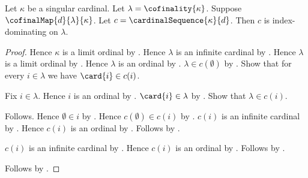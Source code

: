 \begin{proposition}\label{cardinal_sequence_is_index_dominating}
    Let $\kappa$ be a singular cardinal.
    Let $\lambda=\cofinality{\kappa}$.
    Suppose $\cofinalMap{d}{\lambda}{\kappa}$.
    Let $c=\cardinalSequence{\kappa}{d}$.
    Then $c$ is index-dominating on $\lambda$.
\end{proposition}
\begin{proof}
    Hence $\kappa$ is a limit ordinal
        by .
    Hence $\lambda$ is an infinite cardinal
        by .
    Hence $\lambda$ is a limit ordinal
        by .
    Hence $\lambda$ is an ordinal by .
    $\lambda\in c(\emptyset)$
        by .
    Show that for every $i\in\lambda$ we have $\card{i}\in c(i)$.
    \begin{subproof}
        Fix $i\in\lambda$.
        Hence $i$ is an ordinal by .
        $\card{i}\in\lambda$ by .
        Show that $\lambda\in c(i)$.
        \begin{subproof}
            \begin{byCase}
                    Follows.
                    Hence $\emptyset\in i$
                        by .
                    Hence $c(\emptyset)\in c(i)$
                        by .
                    $c(i)$ is an infinite cardinal
                        by .
                    Hence $c(i)$ is an ordinal
                        by .
                    Follows by .
            \end{byCase}
        \end{subproof}
        $c(i)$ is an infinite cardinal
            by .
        Hence $c(i)$ is an ordinal by .
        Follows by .
    \end{subproof}
    Follows by .
\end{proof}

